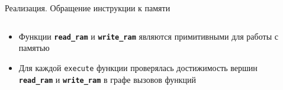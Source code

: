 \documentclass
  [ russian
  , aspectratio=169 %
  ] {beamer}
\begin{document}
\begin{frame}[fragile]{Реализация. Обращение инструкции к памяти}

    \begin{columns}
        \begin{column}{0.6\textwidth}
            \begin{itemize}
                \item Функции \textbf{\texttt{read\_ram}} и \textbf{\texttt{write\_ram}} являются примитивными для работы с памятью
                \item Для каждой \texttt{execute} функции проверялась достижимость вершин \textbf{\texttt{read\_ram}} и \textbf{\texttt{write\_ram}} в графе вызовов функций


            \end{itemize}
        \end{column}

        \begin{column}{0.4\textwidth}

            \begin{center}
                \begin{tikzpicture}[
                        node distance=1cm,
                        box/.style={
                                draw,
                                rectangle,
                                rounded corners,
                                minimum width=2cm,
                                minimum height=1cm,
                                align=center
                            },
                        edge/.style={
                                ->,
                                >=Stealth,
                                shorten >=1pt,
                                shorten <=1pt
                            },
                        every label/.style={
                                font=\small
                            }
                    ]


\end{tikzpicture}
\end{center}
\end{column}
\end{columns}
\end{frame}
\end{document}
